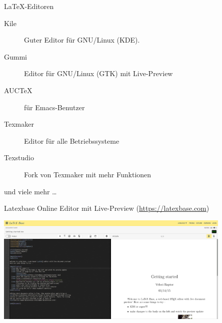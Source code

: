 \documentclass{beamer}
\begin{document}
			
		\begin{frame}{\LaTeX-Editoren}
			\begin{description}
				\item[Kile] Guter Editor für GNU/Linux (KDE).
				\item[Gummi] Editor für GNU/Linux (GTK) mit Live-Preview
				\item[AUCTeX] für Emacs-Benutzer
				\item[Texmaker] Editor für alle Betriebssysteme
				\item[Texstudio] Fork von Texmaker mit mehr Funktionen
			\end{description}
			 und viele mehr \dots
		\end{frame}
		

%			
		
		
		\begin{frame}{Latexbase}
			Online Editor mit Live-Preview (\url{https://latexbase.com})
			
			\begin{center}
				\includegraphics[width=0.85\textwidth]{images/latexbase}
			\end{center}
		\end{frame}
		
		
\end{document}
